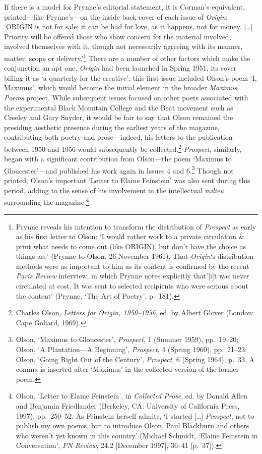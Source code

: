 \documentclass[]{article}
\begin{document}
If there is a model for Prynne’s editorial statement, it is Corman’s
equivalent, printed—like Prynne’s—on the inside back cover of each issue
of \emph{Origin}: ‘ORIGIN is not for sale; it can be had for love, as it
happens, not for money. {[}\ldots{}{]} Priority will be offered those
who show concern for the material involved, involved themselves with it,
though not necessarily agreeing with its manner, matter, scope or
delivery.’\footnote{Prynne reveals his intention to transform the
  distribution of \emph{Prospect} as early as his first letter to Olson:
  ‘I would rather work to a private circulation \& print what needs to
  come out (like ORIGIN), but don’t have the choice as things are’
  (Prynne to Olson, 26 November 1961). That \emph{Origin}‘s distribution
  methods were as important to him as its content is confirmed by the
  recent \emph{Paris Review} interview, in which Prynne notes explicitly
  that’{[}i{]}t was never circulated at cost. It was sent to selected
  recipients who were serious about the content’ (Prynne, ‘The Art of
  Poetry’, p.~181).} There are a number of other factors which make the
conjunction an apt one. \emph{Origin} had been launched in Spring 1951,
its cover billing it as ‘a quarterly for the creative’; this first issue
included Olson’s poem ‘I, Maximus’, which would become the initial
element in the broader \emph{Maximus Poems} project. While subsequent
issues focused on other poets associated with the experimental Black
Mountain College and the Beat movement such as Creeley and Gary Snyder,
it would be fair to say that Olson remained the presiding aesthetic
presence during the earliest years of the magazine, contributing both
poetry and prose—indeed, his letters to the publication between 1950 and
1956 would subsequently be collected.\footnote{Charles Olson,
  \emph{Letters for Origin, 1950–1956}, ed. by Albert Glover (London:
  Cape Goliard, 1969).} \emph{Prospect}, similarly, began with a
significant contribution from Olson—the poem ‘Maximus to Gloucester’—and
published his work again in Issues 4 and 6.\footnote{Olson, ‘Maximus to
  Gloucester’, \emph{Prospect}, 1 (Summer 1959), pp.~19–20; Olson, ‘A
  Plantation—A Beginning’, \emph{Prospect}, 4 (Spring 1960), pp.~21–23;
  Olson, ‘Going Right Out of the Century’, \emph{Prospect}, 6 (Spring
  1964), p.~33. A comma is inserted after ‘Maximus’ in the collected
  version of the former poem.} Though not printed, Olson’s important
‘Letter to Elaine Feinstein’ was also sent during this period, adding to
the sense of his involvement in the intellectual \emph{milieu}
surrounding the magazine.\footnote{Olson, ‘Letter to Elaine Feinstein’,
  in \emph{Collected Prose}, ed. by Donald Allen and Benjamin
  Friedlander (Berkeley, CA: University of California Press, 1997),
  pp.~250–52. As Feinstein herself admits, ‘I started {[}\ldots{}{]}
  \emph{Prospect}, not to publish my own poems, but to introduce Olson,
  Paul Blackburn and others who weren’t yet known in this country’
  (Michael Schmidt, ‘Elaine Feinstein in Conversation’, \emph{PN
  Review}, 24.2 {[}December 1997{]}, 36–41 {[}p.~37{]}).}
\end{document}
